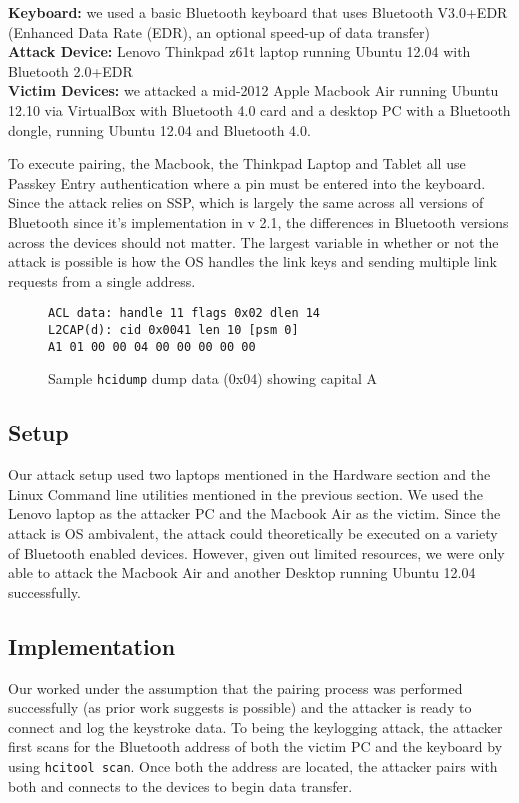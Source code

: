 \documentclass{acm_proc_article-sp}
\begin{document}
\textbf{Keyboard:} we used a basic Bluetooth keyboard that uses Bluetooth V3.0+EDR (Enhanced Data Rate (EDR), an optional speed-up of data transfer)\\
\textbf{Attack Device:} Lenovo Thinkpad z61t laptop running Ubuntu 12.04 with Bluetooth 2.0+EDR\\
\textbf{Victim Devices:} we attacked a mid-2012 Apple Macbook Air running Ubuntu 12.10 via VirtualBox with
Bluetooth 4.0 card and a desktop PC with a Bluetooth dongle, running Ubuntu 12.04 and Bluetooth 4.0.

To execute pairing, the Macbook, the Thinkpad Laptop and Tablet all use Passkey Entry authentication where a pin must be entered into the keyboard. Since the attack relies on SSP, which is largely the same across all versions of Bluetooth since it's implementation in v 2.1, the differences in Bluetooth versions across the devices should not matter. The largest variable in whether or not the attack is possible is how the OS handles the link keys and sending multiple link requests from a single address. 
\begin{figure}
\begin{verbatim}
ACL data: handle 11 flags 0x02 dlen 14
L2CAP(d): cid 0x0041 len 10 [psm 0]
A1 01 00 00 04 00 00 00 00 00
\end{verbatim}
\caption{Sample \texttt{hcidump} dump data (0x04) showing capital A}
\label{fig:mypic}
\end{figure}

\subsection{Setup}
Our attack setup used two laptops mentioned in the Hardware section and the Linux Command line utilities mentioned in the previous section. We used the Lenovo laptop as the attacker PC and the Macbook Air as the victim. Since the attack is OS ambivalent, the attack could theoretically be executed on a variety of Bluetooth enabled devices. However, given out limited resources, we were only able to attack the Macbook Air and another Desktop running Ubuntu 12.04 successfully.

\subsection{Implementation}
Our worked under the assumption that the pairing process was performed successfully (as prior work suggests is possible) and the attacker is ready to connect and log the keystroke data. To being the keylogging attack, the attacker first scans for the Bluetooth address of both the victim PC and the keyboard by using \texttt{hcitool scan}. Once both the address are located, the attacker pairs with both and connects to the devices to begin data transfer.
\end{document}

